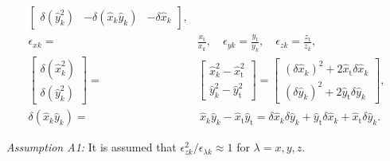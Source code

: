\documentclass[lettersize,journal]{IEEEtran}
\begin{document}
\begin{align*}
\begin{bmatrix}
    \delta (\hat{y}_k^2) & - \delta (\hat{x}_k \hat{y}_k) & - \delta \hat{x}_k\end{bmatrix}, \\
    \epsilon_{xk} =& \frac{x_{\text{t}}}{x_{k}},\quad \epsilon_{yk} = \frac{y_{\text{t}}}{y_{k}},\quad \epsilon_{zk} = \frac{z_{\text{t}}}{z_{k}},  \\
    \begin{bmatrix} \delta (\hat{x}_k^2) \\ \delta (\hat{y}_k^2) \end{bmatrix} =&
    \begin{bmatrix} \hat{x}_k^2 - \hat{x}_{\text{t}}^2 \\ \hat{y}_k^2 - \hat{y}_{\text{t}}^2 \end{bmatrix} = \begin{bmatrix} (\delta \hat{x}_k)^2 + 2 \hat{x}_{\text{t}} \delta \hat{x}_k \\ (\delta \hat{y}_k)^2 + 2 \hat{y}_{\text{t}} \delta \hat{y}_k \end{bmatrix}, \\
    \delta (\hat{x}_k \hat{y}_k) =& ~ \hat{x}_k \hat{y}_k - \hat{x}_{\text{t}} \hat{y}_{\text{t}} = \delta \hat{x}_k \delta \hat{y}_k + \hat{y}_{\text{t}} \delta \hat{x}_k + \hat{x}_{\text{t}} \delta \hat{y}_k.
\end{align*}

\textit{Assumption A1:} It is assumed that $\epsilon_{zk}^2/\epsilon_{\lambda k} \approx 1$ for $\lambda = x, y, z$.
\end{document}
